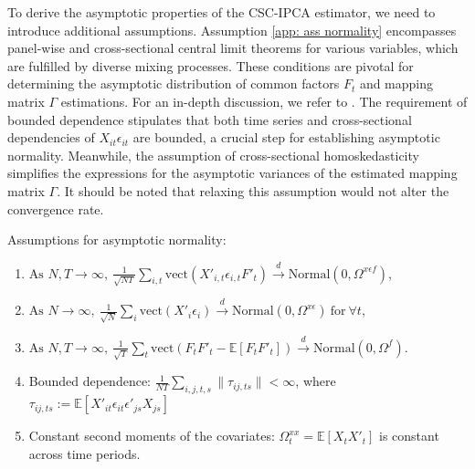 \documentclass[12pt]{article}
\begin{document}
To derive the asymptotic properties of the CSC-IPCA estimator, we need to introduce additional assumptions. Assumption \ref{app: ass normality} encompasses panel-wise and cross-sectional central limit theorems for various variables, which are fulfilled by diverse mixing processes. These conditions are pivotal for determining the asymptotic distribution of common factors $F_t$ and mapping matrix $\Gamma$ estimations. For an in-depth discussion, we refer to \cite{kelly2020instrumented}. The requirement of bounded dependence stipulates that both time series and cross-sectional dependencies of $X_{it}\epsilon_{it}$ are bounded, a crucial step for establishing asymptotic normality. Meanwhile, the assumption of cross-sectional homoskedasticity simplifies the expressions for the asymptotic variances of the estimated mapping matrix $\Gamma$. It should be noted that relaxing this assumption would not alter the convergence rate.

\begin{assumption}
    Assumptions for asymptotic normality:
    \begin{enumerate}
        \item $\text{As } N, T \to \infty, \: \frac{1}{\sqrt{NT}} \sum_{i,t} \text{vect}\left( X'_{i,t} \epsilon_{i,t} F'_{t} \right) \xrightarrow{d} \text{Normal} \left(0, \Omega^{x\epsilon f} \right)$,
        
        \item $\text{As } N \to \infty, \: \frac{1}{\sqrt{N}} \sum_{i} \text{vect}\left( X'_{i} \epsilon_{i} \right) \xrightarrow{d} \text{Normal} \left(0, \Omega^{x\epsilon} \right) \: \text{for} \: \forall t$,
        
        \item $\text{As } N, T \to \infty, \: \frac{1}{\sqrt{T}} \sum_{t} \text{vect}\left( F_{t}F'_{t} - \mathbb{E}[F_{t}F'_{t}] \right) \xrightarrow{d} \text{Normal} \left(0, \Omega^{f} \right)$.
        
        \item Bounded dependence: $\frac{1}{NT} \sum_{i,j,t,s}\|\tau_{ij, ts}\| < \infty$, where $\tau_{ij, ts} := \mathbb{E} \left[ X'_{it} \epsilon_{it} \epsilon'_{js} X_{js} \right]$
        
        \item Constant second moments of the covariates: $\Omega_t^{xx} = \mathbb{E}\left[ X_{t} X'_{t} \right]$ is constant across time periods.
    \end{enumerate}
        \label{app: ass normality}
\end{assumption}
\end{document}
